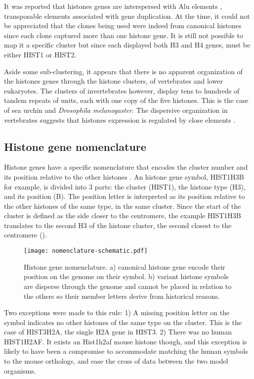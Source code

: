     It was reported that histones genes are interspersed with Alu
    elements \citep{histone-alu}, transposable elements associated with gene
    duplication. At the time, it could not be appreciated that the clones
    being used were indeed from canonical histones since each clone captured
    more than one histone gene. It is still not possible to map it a specific
    cluster but since each displayed both H3 and H4 genes, must be either
    HIST1 or HIST2.

    Aside some sub-clustering, it appears that
    there is no apparent organization
    of the histones genes through the histone clusters, of vertebrates and
    lower eukaryotes. The clusters of invertebrates however, display tens to hundreds
    of tandem repeats of units, each with one copy of the five histones. This is the
    case of sea urchin and \textit{Drosophila melanogaster}. The dispersive organization
    in vertebrates suggests that histones expression is regulated by close elements
    \citep{close-regulators}.

  \subsection{Histone gene nomenclature}
    Histone genes have a specific nomenclature that encodes the cluster number and its
    position relative to the other histones \citep{Marzluff02}. An histone gene
    symbol, HIST1H3B for example, is divided into 3 parts: the cluster (HIST1),
    the histone type (H3), and its position (B). The position letter is interpreted as
    its position relative to the other histones of the same type, in the same cluster.
    Since the start of the cluster is defined as the side closer to the centromere, the
    example HIST1H3B translates to the second H3 of the histone cluster, the
    second closest to the centromere ().

    \begin{figure*}
      \centering
      \texttt{[image: nomenclature-schematic.pdf]}
      \caption{Histone gene nomenclature. a) canonical histone gene encode their position
               on the genome on their symbol. b) variant histone symbols are disperse through
               the genome and cannot be placed in relation to the others so their member
               letters derive from historical reasons.}
      \label{fig:nomenclature}
    \end{figure*}

    Two exceptions were made to this rule: 1) A missing position letter on the symbol indicates
    no other histones of the same type on the cluster. This is the case of HIST3H2A, the
    single H2A gene in HIST3. 2) There was no human HIST1H2AF. It exists an Hist1h2af mouse
    histone though, and this exception is likely to have been a compromise to accommodate
    matching the human symbols to the mouse orthologs, and ease the cross of data between the
    two model organisms.

